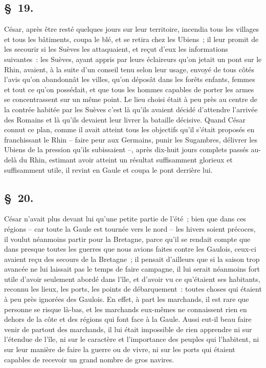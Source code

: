 \documentclass[french,twoside]{book} %
\begin{document}
\subsection[{§ 19.}]{ \textsc{§ 19.} }
\noindent César, après être resté quelques jours sur leur territoire, incendia tous les villages et tous les bâtiments, coupa le blé, et se retira chez les Ubiens ; il leur promit de les secourir si les Suèves les attaquaient, et reçut d’eux les informations suivantes : les Suèves, ayant appris par leurs éclaireurs qu’on jetait un pont sur le Rhin, avaient, à la suite d’un conseil tenu selon leur usage, envoyé de tous côtés l’avis qu’on abandonnât les villes, qu’on déposât dans les forêts enfants, femmes et tout ce qu’on possédait, et que tous les hommes capables de porter les armes se concentrassent sur un même point. Le lieu choisi était à peu près au centre de la contrée habitée par les Suèves c’est là qu’ils avaient décidé d’attendre l’arrivée des Romains et là qu’ils devaient leur livrer la bataille décisive. Quand César connut ce plan, comme il avait atteint tous les objectifs qu’il s’était proposés en franchissant le Rhin – faire peur aux Germains, punir les Sugambres, délivrer les Ubiens de la pression qu’ils subissaient –, après dix-huit jours complets passés au-delà du Rhin, estimant avoir atteint un résultat suffisamment glorieux et suffisamment utile, il revint en Gaule et coupa le pont derrière lui.
\subsection[{§ 20.}]{ \textsc{§ 20.} }
\noindent César n’avait plus devant lui qu’une petite partie de l’été ; bien que dans ces régions – car toute la Gaule est tournée vers le nord – les hivers soient précoces, il voulut néanmoins partir pour la Bretagne, parce qu’il se rendait compte que dans presque toutes les guerres que nous avions faites contre les Gaulois, ceux-ci avaient reçu des secours de la Bretagne ; il pensait d’ailleurs que si la saison trop avancée ne lui laissait pas le temps de faire campagne, il lui serait néanmoins fort utile d’avoir seulement abordé dans l’île, et d’avoir vu ce qu’étaient ses habitants, reconnu les lieux, les ports, les points de débarquement : toutes choses qui étaient à peu près ignorées des Gaulois. En effet, à part les marchands, il est rare que personne se risque là-bas, et les marchands eux-mêmes ne connaissent rien en dehors de la côte et des régions qui font face à la Gaule. Aussi eut-il beau faire venir de partout des marchands, il lui était impossible de rien apprendre ni sur l’étendue de l’île, ni sur le caractère et l’importance des peuples qui l’habitent, ni sur leur manière de faire la guerre ou de vivre, ni sur les ports qui étaient capables de recevoir un grand nombre de gros navires.
\end{document}

